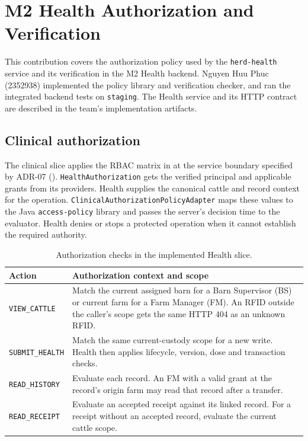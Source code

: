\section{M2 Health Authorization and Verification}\label{sec:m2-health}

This contribution covers the authorization policy used by the
\texttt{herd-health} service and its verification in the M2 Health
backend. Nguyen Huu Phuc (2352938) implemented the policy library and
verification checker, and ran the integrated backend tests on
\texttt{staging}. The Health service and its HTTP contract are described
in the team's implementation artifacts.\cite{m2HealthStaging,m2HealthContract}

\subsection{Clinical authorization}\label{sec:m2-health-auth}

The clinical slice applies the RBAC matrix in  at the
service boundary specified by ADR-07 ().
\texttt{HealthAuthorization} gets the verified principal and applicable
grants from its providers. Health supplies the canonical cattle and
record context for the operation. \texttt{ClinicalAuthorizationPolicyAdapter}
maps these values to the Java \texttt{access-policy} library and passes
the server's decision time to the evaluator. Health denies or stops a
protected operation when it cannot establish the required authority.

\begin{table}[htbp]
\centering
\small
\begin{tabularx}{\linewidth}{@{}lX@{}}
\toprule
\textbf{Action} & \textbf{Authorization context and scope} \\
\midrule
\texttt{VIEW\_CATTLE} & Match the current assigned barn for a Barn
Supervisor (BS) or current farm for a Farm Manager (FM). An RFID outside
the caller's scope gets the same HTTP 404 as an unknown RFID. \\
\texttt{SUBMIT\_HEALTH} & Match the same current-custody scope for a
new write. Health then applies lifecycle, version, dose and transaction
checks. \\
\texttt{READ\_HISTORY} & Evaluate each record. An FM with a valid grant
at the record's origin farm may read that record after a transfer. \\
\texttt{READ\_RECEIPT} & Evaluate an accepted receipt against its linked
record. For a receipt without an accepted record, evaluate the current
cattle scope. \\
\bottomrule
\end{tabularx}
\caption{Authorization checks in the implemented Health slice.}
\label{tab:m2-health-policy}
\end{table}

